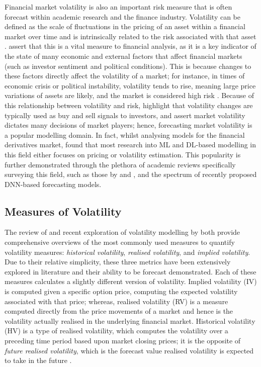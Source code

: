 \documentclass[a4paper, 11pt]{report}
\begin{document}
    Financial market volatility is also an important risk measure that is often forecast within academic research and the finance industry. Volatility can be defined as the scale of fluctuations in the pricing of an asset within a financial market over time and is intrinsically related to the risk associated with that asset \citep{cavalcante-2016}. \citet{cavalcante-2016} assert that this is a vital measure to financial analysis, as it is a key indicator of the state of many economic and external factors that affect financial markets (such as investor sentiment and political conditions). This is because changes to these factors directly affect the volatility of a market; for instance, in times of economic crisis or political instability, volatility tends to rise, meaning large price variations of assets are likely, and the market is considered high risk \citep{sezer-2019}. Because of this relationship between volatility and risk, \citet{tino-2001} highlight that volatility changes are typically used as buy and sell signals to investors, and \citet{ge-2022} assert market volatility dictates many decisions of market players; hence, forecasting market volatility is a popular modelling domain. In fact, whilst analysing models for the financial derivatives market, \citet{ozbayoglu-2020} found that most research into ML and DL-based modelling in this field either focuses on pricing or volatility estimation. This popularity is further demonstrated through the plethora of academic reviews specifically surveying this field, such as those by \citet{poon-2003} and \citet{ge-2022}, and the spectrum of recently proposed DNN-based forecasting models.

    \subsection{Measures of Volatility}

    The review of \citet{ge-2022} and recent exploration of volatility modelling by \citet{tino-2001} both provide comprehensive overviews of the most commonly used measures to quantify volatility measures: \emph{historical volatility}, \emph{realised volatility}, and \emph{implied volatility}. Due to their relative simplicity, these three metrics have been extensively explored in literature and their ability to be forecast demonstrated. Each of these measures calculates a slightly different version of volatility. Implied volatility (IV) is computed given a specific option price, computing the expected volatility associated with that price; whereas, realised volatility (RV) is a measure computed directly from the price movements of a market and hence is the volatility actually realised in the underlying financial market. Historical volatility (HV) is a type of realised volatility, which computes the volatility over a preceding time period based upon market closing prices; it is the opposite of \emph{future realised volatility}, which is the forecast value realised volatility is expected to take in the future \citep{busch-2011}.
\end{document}

